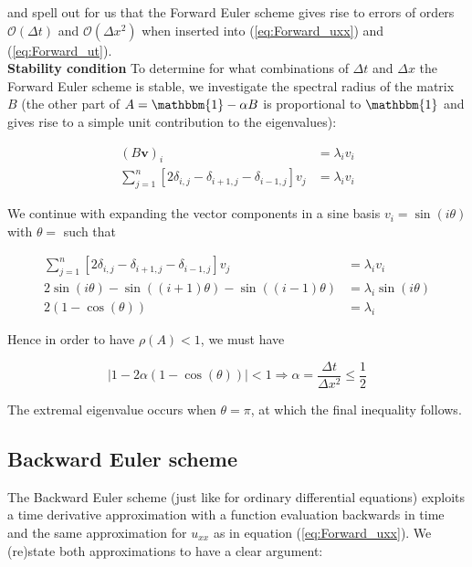 \documentclass[a4paper, 11pt, notitlepage,english]{article}
\newcommand{\id}{\mathbbm{1}}
\begin{document}
and spell out for us that the Forward Euler scheme gives rise to errors of orders $\mathcal{O}(\Delta t)$ and $\mathcal{O}(\Delta x^2)$ when inserted into (\ref{eq:Forward_uxx}) and (\ref{eq:Forward_ut}). \\

\textbf{Stability condition} \newline
To determine for what combinations of $\Delta t$ and $\Delta x$ the Forward Euler scheme is stable, we investigate the spectral radius of the matrix $B$ (the other part of $A = \id - \alpha B$ is proportional to $\id$ and gives rise to a simple unit contribution to the eigenvalues):

\begin{align}
(B\boldsymbol{v})_i &= \lambda_i v_i \\
\sum_{j=1}^n [2\delta_{i,j}-\delta_{i+1,j}-\delta_{i-1,j}]v_j &= \lambda_i v_i
\label{eq:Forward_Euler_stability1}
\end{align}

We continue with expanding the vector components in a sine basis $v_i = \sin(i\theta)$ with $\theta = $ such that

\begin{align}
\sum_{j=1}^n [2\delta_{i,j}-\delta_{i+1,j}-\delta_{i-1,j}]v_j &= \lambda_i v_i \\
2 \sin(i\theta) - \sin\left((i+1)\theta\right) - \sin\left((i-1)\theta\right) &= \lambda_i \sin(i\theta) \\
2(1-\cos(\theta)) &= \lambda_i
\label{eq:Forward_Euler_stability2}
\end{align}

Hence in order to have $\rho(A) < 1$, we must have

\begin{equation}
\lvert 1-2\alpha(1-\cos(\theta)) \rvert < 1 \Rightarrow \alpha = \frac{\Delta t}{\Delta x^2} \leq \frac{1}{2}
\label{eq:Forward_Euler_stability3}
\end{equation}

The extremal eigenvalue occurs when $\theta = \pi$, at which the final inequality follows.

\subsection{Backward Euler scheme}
The Backward Euler scheme (just like for ordinary differential equations) exploits a time derivative approximation with a function evaluation backwards in time and the same approximation for $u_{xx}$ as in equation (\ref{eq:Forward_uxx}). We (re)state both approximations to have a clear argument:
\end{document}

